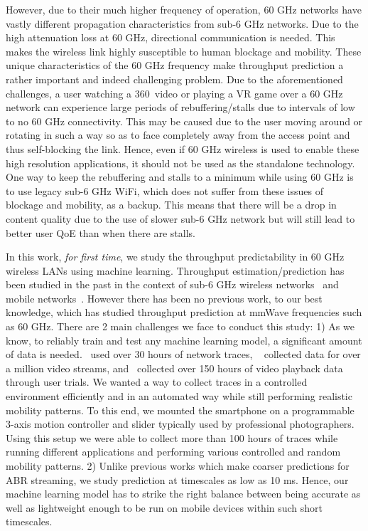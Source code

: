 \documentclass[sigconf,anonymous]{acmart}
\begin{document}
However, due to their much higher frequency of operation, 60 GHz networks have vastly different propagation characteristics from sub-6 GHz networks. Due to the high attenuation loss at 60 GHz, directional communication is needed. This makes the wireless link highly susceptible to human blockage and mobility. These unique characteristics of the 60 GHz frequency make throughput prediction a rather important and indeed challenging problem. Due to the aforementioned challenges, a user watching a 360\degree~video or playing a VR game over a 60 GHz network can experience large periods of rebuffering/stalls due to intervals of low to no 60 GHz connectivity. This may be caused due to the user moving around or rotating in such a way so as to face completely away from the access point and thus self-blocking the link. Hence, even if 60 GHz wireless is used to enable these high resolution applications, it should not be used as the standalone technology. One way to keep the rebuffering and stalls to a minimum while using 60 GHz is to use legacy sub-6 GHz WiFi, which does not suffer from these issues of blockage and mobility, as a backup. This means that there will be a drop in content quality due to the use of slower sub-6 GHz network but will still lead to better user QoE than when there are stalls.

In this work, \textit{for first time}, we study the throughput predictability in 60 GHz wireless LANs using machine learning. Throughput estimation/prediction has been studied in the past in the context of sub-6 GHz wireless networks~\cite{khan:infocom2016,song:secon2017,kajita:wmnc2015} and mobile networks~\cite{liu:globecom2015}. However there has been no previous work, to our best knowledge, which has studied throughput prediction at mmWave frequencies such as 60 GHz. There are 2 main challenges we face to conduct this study: 1) As we know, to reliably train and test any machine learning model, a significant amount of data is needed.~\cite{mao:sigcomm2017} used over 30 hours of network traces, ~\cite{yan:nsdi2020} collected data for over a million video streams, and~\cite{xu:conext2017} collected over 150 hours of video playback data through user trials. We wanted a way to collect traces in a controlled environment efficiently and in an automated way while still performing realistic mobility patterns. To this end, we mounted the smartphone on a programmable 3-axis motion controller and slider typically used by professional photographers. Using this setup we were able to collect more than 100 hours of traces while running different applications and performing various controlled and random mobility patterns. 2) Unlike previous works which make coarser predictions for ABR streaming, we study prediction at timescales as low as 10 ms. Hence, our machine learning model has to strike the right balance between being accurate as well as lightweight enough to be run on mobile devices within such short timescales.
\end{document}
